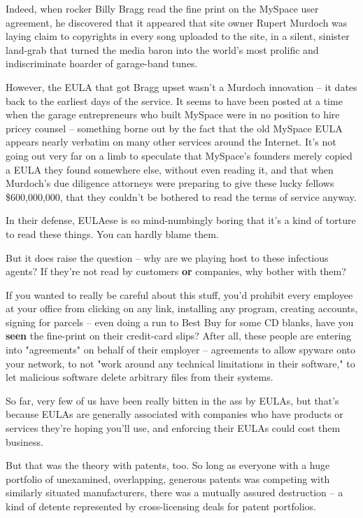 Indeed, when rocker Billy Bragg read the fine print on the MySpace
user agreement, he discovered that it appeared that site owner
Rupert Murdoch was laying claim to copyrights in every song
uploaded to the site, in a silent, sinister land-grab that turned
the media baron into the world's most prolific and indiscriminate
hoarder of garage-band tunes.

However, the EULA that got Bragg upset wasn't a Murdoch innovation
-- it dates back to the earliest days of the service. It seems to
have been posted at a time when the garage entrepreneurs who built
MySpace were in no position to hire pricey counsel -- something
borne out by the fact that the old MySpace EULA appears nearly
verbatim on many other services around the Internet. It's not going
out very far on a limb to speculate that MySpace's founders merely
copied a EULA they found somewhere else, without even reading it,
and that when Murdoch's due diligence attorneys were preparing to
give these lucky fellows \$600,000,000, that they couldn't be
bothered to read the terms of service anyway.

In their defense, EULAese is so mind-numbingly boring that it's a
kind of torture to read these things. You can hardly blame them.

But it does raise the question -- why are we playing host to these
infectious agents? If they're not read by customers \textbf{or}
companies, why bother with them?

If you wanted to really be careful about this stuff, you'd prohibit
every employee at your office from clicking on any link, installing
any program, creating accounts, signing for parcels -- even doing a
run to Best Buy for some CD blanks, have you \textbf{seen} the
fine-print on their credit-card slips? After all, these people are
entering into "agreements" on behalf of their employer --
agreements to allow spyware onto your network, to not "work around
any technical limitations in their software," to let malicious
software delete arbitrary files from their systems.

So far, very few of us have been really bitten in the ass by EULAs,
but that's because EULAs are generally associated with companies
who have products or services they're hoping you'll use, and
enforcing their EULAs could cost them business.

But that was the theory with patents, too. So long as everyone with
a huge portfolio of unexamined, overlapping, generous patents was
competing with similarly situated manufacturers, there was a
mutually assured destruction -- a kind of detente represented by
cross-licensing deals for patent portfolios.


